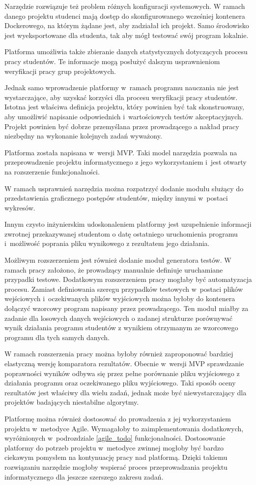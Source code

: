Narzędzie rozwiązuje też problem różnych konfiguracji systemowych.
W ramach danego projektu studenci mają dostęp do skonfigurowanego wcześniej kontenera Dockerowego, na którym żądane jest, aby zadziałał ich projekt.
Samo środowisko jest wyeksportowane dla studenta, tak aby mógł testować swój program lokalnie.

Platforma umożliwia także zbieranie danych statystycznych dotyczących procesu pracy studentów.
Te informacje mogą posłużyć dalszym usprawnieniom weryfikacji pracy grup projektowych.

Jednak samo wprowadzenie platformy w~ramach programu nauczania nie jest wystarczające, aby uzyskać  korzyści dla procesu weryfikacji pracy studentów.
Istotna jest właściwa definicja projektu, który powinien być tak skonstruowany, aby umożliwić napisanie odpowiednich i~wartościowych testów akceptacyjnych.
Projekt powinien być dobrze przemyślana przez prowadzącego a nakład pracy niezbędny na wykonanie kolejnych zadań wyważony.

Platforma została napisana w~wersji MVP.
Taki model narzędzia pozwala na przeprowadzenie projektu informatycznego z jego wykorzystaniem i~jest otwarty na rozszerzenie funkcjonalności.

W ramach usprawnień narzędzia można rozpatrzyć dodanie modułu służący do przedstawienia graficznego postępów studentów, między innymi w~postaci wykresów.

Innym czysto inżynierskim udoskonaleniem platformy jest uzupełnienie informacji zwrotnej przekazywanej studentom o datę ostatniego uruchomienia programu i~możliwość poprania pliku wynikowego z rezultatem jego działania.

Możliwym rozszerzeniem jest również dodanie moduł generatora testów.
W ramach pracy założono, że prowadzący manualnie definiuje uruchamiane przypadki testowe.
Dodatkowym rozszerzeniem pracy mogłaby być automatyzacja procesu.
Zamiast definiowania szeregu przypadków testowych w~postaci plików wejściowych i~oczekiwanych plików wyjściowych można byłoby do kontenera dołączyć wzorcowy program napisany przez prowadzącego.
Ten moduł miałby za zadanie dla losowych danych wejściowych o zadanej strukturze porównywać wynik działania programu studentów z wynikiem otrzymanym ze wzorcowego programu dla tych samych danych.

W ramach rozszerzenia pracy można byłoby również zaproponować bardziej elastyczną wersję komparatora rezultatów.
Obecnie w~wersji MVP sprawdzanie poprawności wyników odbywa się przez pełne porównanie pliku wyjściowego z działania programu oraz oczekiwanego pliku wyjściowego.
Taki sposób oceny rezultatów jest właściwy dla wielu zadań, jednak może być niewystarczający dla projektów badających niestabilne algorytmy.

Platformę można również dostosować do prowadzenia z jej wykorzystaniem projektu w~metodyce Agile.
Wymagałoby to zaimplementowania dodatkowych, wyróżnionych w~podrozdziale \ref{agile_todo} funkcjonalności.
Dostosowanie platformy do potrzeb projektu w~metodyce zwinnej mogłoby być bardzo ciekawym pomysłem na kontynuację pracy nad platformą.
Dzięki takiemu rozwiązaniu narzędzie mogłoby wspierać proces przeprowadzania projektu informatycznego dla jeszcze szerszego zakresu zadań.